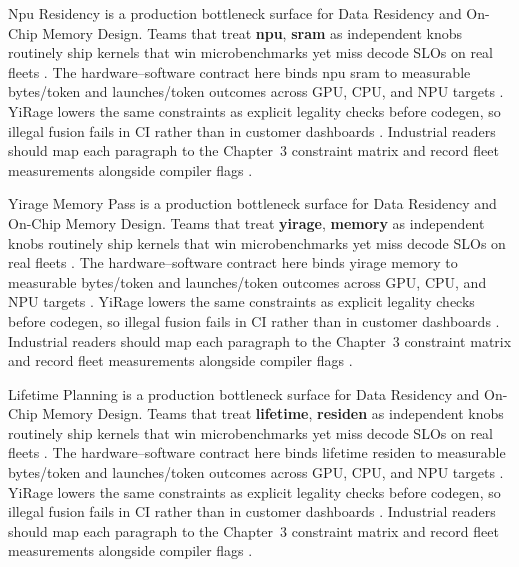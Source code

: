 Npu Residency is a production bottleneck surface for Data Residency and On-Chip Memory Design. Teams that treat \textbf{npu}, \textbf{sram} as independent knobs routinely ship kernels that win microbenchmarks yet miss decode SLOs on real fleets \citep{nvidia2024cudagraphs,taxbreak2026}. The hardware--software contract here binds npu sram to measurable bytes/token and launches/token outcomes across GPU, CPU, and NPU targets \citep{liu2024deepseekv3,memoryfloor2026}. YiRage lowers the same constraints as explicit legality checks before codegen, so illegal fusion fails in CI rather than in customer dashboards \citep{patel2025llminference,nvidia2022hopper}. Industrial readers should map each paragraph to the Chapter~3 constraint matrix and record fleet measurements alongside compiler flags \citep{taxbreak2026,semianalysis2024tma}.

Yirage Memory Pass is a production bottleneck surface for Data Residency and On-Chip Memory Design. Teams that treat \textbf{yirage}, \textbf{memory} as independent knobs routinely ship kernels that win microbenchmarks yet miss decode SLOs on real fleets \citep{liu2024deepseekv3,memoryfloor2026}. The hardware--software contract here binds yirage memory to measurable bytes/token and launches/token outcomes across GPU, CPU, and NPU targets \citep{patel2025llminference,nvidia2022hopper}. YiRage lowers the same constraints as explicit legality checks before codegen, so illegal fusion fails in CI rather than in customer dashboards \citep{taxbreak2026,semianalysis2024tma}. Industrial readers should map each paragraph to the Chapter~3 constraint matrix and record fleet measurements alongside compiler flags \citep{memoryfloor2026,amd2024xdna}.

Lifetime Planning is a production bottleneck surface for Data Residency and On-Chip Memory Design. Teams that treat \textbf{lifetime}, \textbf{residen} as independent knobs routinely ship kernels that win microbenchmarks yet miss decode SLOs on real fleets \citep{patel2025llminference,nvidia2022hopper}. The hardware--software contract here binds lifetime residen to measurable bytes/token and launches/token outcomes across GPU, CPU, and NPU targets \citep{taxbreak2026,semianalysis2024tma}. YiRage lowers the same constraints as explicit legality checks before codegen, so illegal fusion fails in CI rather than in customer dashboards \citep{memoryfloor2026,amd2024xdna}. Industrial readers should map each paragraph to the Chapter~3 constraint matrix and record fleet measurements alongside compiler flags \citep{nvidia2022hopper,amd2024aie}.

